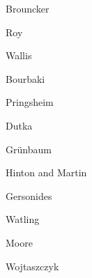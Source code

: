 \documentclass{article}
\begin{document}
Brouncker \cite{brouncker}

Roy \cite{roy}

Wallis \cite{wallis}

Bourbaki \cite[p.~261, chapter III, \S 5.1]{bourbaki}

Pringsheim \cite{pringsheim}

Dutka \cite{dutka}

Gr\"unbaum \cite{grunbaum}

Hinton and Martin \cite{achilles}

Gersonides \cite{gersonides}

Watling \cite{watling}

Moore \cite{moore}

Wojtaszczyk \cite[Chapter 7]{wojtaszczyk}



\end{document}
